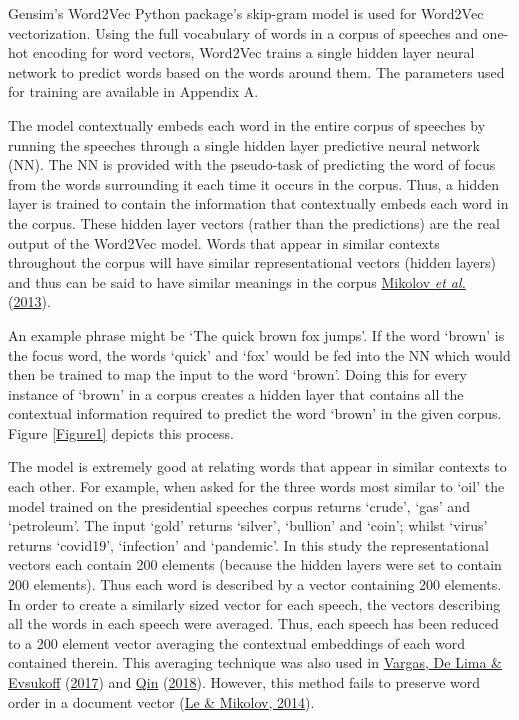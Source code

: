 \documentclass[11pt,preprint, authoryear]{elsarticle}
\numberwithin{equation}{section}
\numberwithin{figure}{section}
\numberwithin{table}{section}
\begin{document}
Gensim's Word2Vec Python package's skip-gram model is used for Word2Vec
vectorization. Using the full vocabulary of words in a corpus of
speeches and one-hot encoding for word vectors, Word2Vec trains a single
hidden layer neural network to predict words based on the words around
them. The parameters used for training are available in Appendix A.

The model contextually embeds each word in the entire corpus of speeches
by running the speeches through a single hidden layer predictive neural
network (NN). The NN is provided with the pseudo-task of predicting the
word of focus from the words surrounding it each time it occurs in the
corpus. Thus, a hidden layer is trained to contain the information that
contextually embeds each word in the corpus. These hidden layer vectors
(rather than the predictions) are the real output of the Word2Vec model.
Words that appear in similar contexts throughout the corpus will have
similar representational vectors (hidden layers) and thus can be said to
have similar meanings in the corpus
\protect\hyperlink{ref-mikolov2013distributed}{Mikolov \emph{et al.}}
(\protect\hyperlink{ref-mikolov2013distributed}{2013}).

An example phrase might be `The quick brown fox jumps'. If the word
`brown' is the focus word, the words `quick' and `fox' would be fed into
the NN which would then be trained to map the input to the word `brown'.
Doing this for every instance of `brown' in a corpus creates a hidden
layer that contains all the contextual information required to predict
the word `brown' in the given corpus. Figure \ref{Figure1} depicts this
process.

The model is extremely good at relating words that appear in similar
contexts to each other. For example, when asked for the three words most
similar to `oil' the model trained on the presidential speeches corpus
returns `crude', `gas' and `petroleum'. The input `gold' returns
`silver', `bullion' and `coin'; whilst `virus' returns `covid19',
`infection' and `pandemic'. In this study the representational vectors
each contain 200 elements (because the hidden layers were set to contain
200 elements). Thus each word is described by a vector containing 200
elements. In order to create a similarly sized vector for each speech,
the vectors describing all the words in each speech were averaged. Thus,
each speech has been reduced to a 200 element vector averaging the
contextual embeddings of each word contained therein. This averaging
technique was also used in
\protect\hyperlink{ref-vargas2017deep}{Vargas, De Lima \& Evsukoff}
(\protect\hyperlink{ref-vargas2017deep}{2017}) and
\protect\hyperlink{ref-qin230natural}{Qin}
(\protect\hyperlink{ref-qin230natural}{2018}). However, this method
fails to preserve word order in a document vector
(\protect\hyperlink{ref-le2014distributed}{Le \& Mikolov, 2014}).
\end{document}
